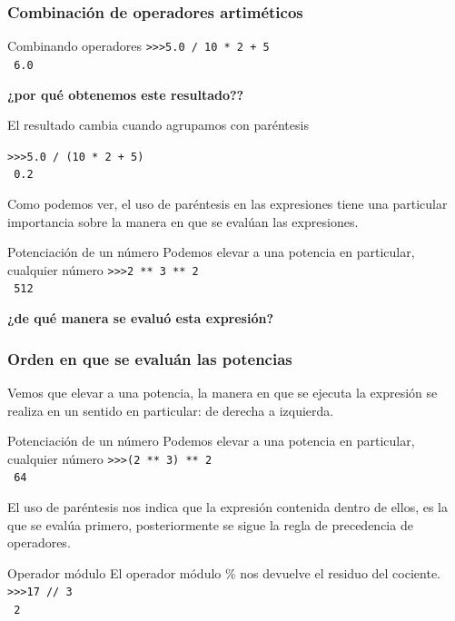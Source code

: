 {\begin{frame}[fragile]
\end{frame}
\begin{frame}[fragile]
\frametitle{Combinación de operadores artiméticos}
\begin{block}{Combinando operadores}
\verb|>>>5.0 / 10 * 2 + 5| \\
\pause
\verb| 6.0|
\end{block}
\pause
\textbf{¿por qué obtenemos este resultado??}
\end{frame}
\begin{frame}[fragile]
El resultado cambia cuando agrupamos con paréntesis
\begin{block}{}
\verb|>>>5.0 / (10 * 2 + 5)| \\
\pause
\verb| 0.2|
\end{block}
\pause
Como podemos ver, el uso de paréntesis en las expresiones tiene una  particular importancia sobre la manera en que se evalúan las expresiones.
\end{frame}
\begin{frame}[fragile]
\begin{block}{Potenciación de un número}
Podemos elevar a una potencia en particular, cualquier número
\verb|>>>2 ** 3 ** 2| \\
\pause
\verb| 512|
\end{block}
\pause
\textbf{¿de qué manera se evaluó esta expresión?}
\end{frame}
\begin{frame}[fragile]
\frametitle{Orden en que se evaluán las potencias}
Vemos que elevar a una potencia, la manera en que se ejecuta la expresión se realiza en un sentido en particular: de derecha a izquierda.
\begin{block}{Potenciación de un número}
Podemos elevar a una potencia en particular, cualquier número
\verb|>>>(2 ** 3) ** 2| \\
\pause
\verb| 64|
\end{block}
\pause
El uso de paréntesis nos indica que la expresión contenida dentro de ellos, es la que se evalúa primero, posteriormente se sigue la regla de precedencia de operadores.
\end{frame}
\begin{frame}[fragile]
\begin{block}{Operador módulo}
El operador módulo $\%$ nos devuelve el residuo del cociente.\\
\verb|>>>17 // 3| \\
\pause
\verb| 2|
\end{block}
\end{frame}
}
